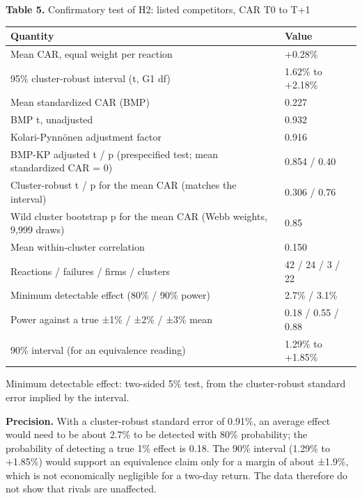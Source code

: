 \documentclass[12pt,a4paper]{article}
\begin{document}
\par\noindent\begin{minipage}{\textwidth}
\textbf{Table 5.} Confirmatory test of H2: listed competitors, CAR T0 to T+1

{\small\setlength{\tabcolsep}{4pt}\begin{tabularx}{\textwidth}{Xl}
\toprule
\textbf{Quantity} & \textbf{Value} \\
\midrule
Mean CAR, equal weight per reaction & +0.28\% \\
95\% cluster-robust interval (t, G\textminus{}1 df) & \textminus{}1.62\% to +2.18\% \\
Mean standardized CAR (BMP) & 0.227 \\
BMP t, unadjusted & 0.932 \\
Kolari-Pynnönen adjustment factor & 0.916 \\
BMP-KP adjusted t / p (prespecified test; mean standardized CAR = 0) & 0.854 / 0.40 \\
Cluster-robust t / p for the mean CAR (matches the interval) & 0.306 / 0.76 \\
Wild cluster bootstrap p for the mean CAR (Webb weights, 9,999 draws) & 0.85 \\
Mean within-cluster correlation & 0.150 \\
Reactions / failures / firms / clusters & 42 / 24 / 3 / 22 \\
Minimum detectable effect (80\% / 90\% power) & 2.7\% / 3.1\% \\
Power against a true ±1\% / ±2\% / ±3\% mean & 0.18 / 0.55 / 0.88 \\
90\% interval (for an equivalence reading) & \textminus{}1.29\% to +1.85\% \\
\bottomrule
\end{tabularx}}
\vspace{6pt}

Minimum detectable effect: two-sided 5\% test, from the cluster-robust standard error implied by the interval.

\end{minipage}\par\vspace{4pt}

\textbf{Precision.} With a cluster-robust standard error of 0.91\%, an average effect would need to be about 2.7\% to be detected with 80\% probability; the probability of detecting a true 1\% effect is 0.18. The 90\% interval (\textminus{}1.29\% to +1.85\%) would support an equivalence claim only for a margin of about ±1.9\%, which is not economically negligible for a two-day return. The data therefore do not show that rivals are unaffected.
\end{document}
